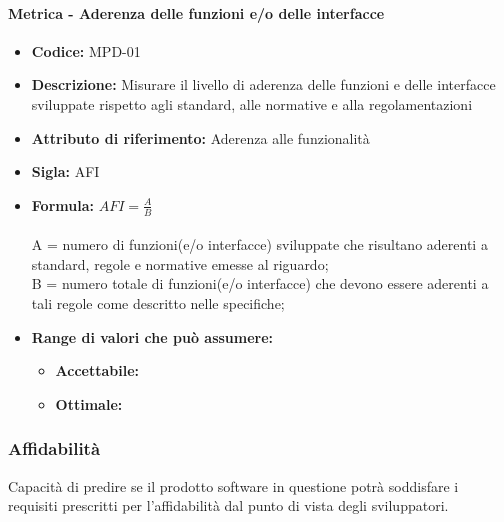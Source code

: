               \paragraph{Metrica - Aderenza delle funzioni e/o delle interfacce} 
              \begin{itemize}
          \item  \textbf{Codice:} MPD-01
        \item    \textbf{Descrizione:} Misurare il livello di aderenza delle funzioni e delle interfacce sviluppate rispetto agli standard, alle normative e alla regolamentazioni
          \item  \textbf{Attributo di riferimento:} Aderenza alle funzionalità 
        \item    \textbf{Sigla:} AFI
         \item   \textbf{Formula:} \begin{math}AFI = \frac{A}{B}\end{math}\\ \\
              A = numero di funzioni(e/o interfacce) sviluppate che risultano aderenti a standard, regole e normative emesse al riguardo; \\
              B = numero totale di funzioni(e/o interfacce) che devono essere aderenti a tali regole come descritto nelle specifiche;
                   \item \textbf{Range di valori che può assumere:}
        \begin{itemize}
            \item \textbf{Accettabile:} 
            \item \textbf{Ottimale:} 
        \end{itemize}
       \end{itemize}
              
  \subsubsection{Affidabilità} 
  Capacità di predire se il prodotto software in questione potrà soddisfare i requisiti prescritti per l'affidabilità dal punto di vista degli sviluppatori.\
